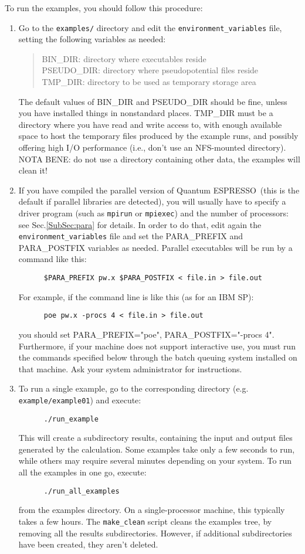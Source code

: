 \documentclass[12pt,a4paper]{article}
\def\qe{{\sc Quantum ESPRESSO}}
\begin{document}
To run the examples, you should follow this procedure:
\begin{enumerate}   
\item Go to the \texttt{examples/} directory and edit the 
  \texttt{environment\_variables} file, setting the following variables as needed: 
\begin{quote}
   BIN\_DIR: directory where executables reside\\
   PSEUDO\_DIR: directory where pseudopotential files reside\\
   TMP\_DIR: directory to be used as temporary storage area
\end{quote}
The default values of BIN\_DIR and PSEUDO\_DIR should be fine, 
unless you have installed things in nonstandard places. TMP\_DIR 
must be a directory where you have read and write access to, with 
enough available space to host the temporary files produced by the 
example runs, and possibly offering high I/O performance (i.e., don't 
use an NFS-mounted directory). NOTA BENE: do not use a
directory containing other data, the examples will clean it!
\item If you have compiled the parallel version of \qe\ (this
is the default if parallel libraries are detected), you will usually
have to specify a driver program (such as \texttt{mpirun} or \texttt{mpiexec}) 
and the number of processors: see Sec.\ref{SubSec:para} for
details. In order to do that, edit again the \texttt{environment\_variables} 
file
and set the PARA\_PREFIX and PARA\_POSTFIX variables as needed. 
Parallel executables will be run by a command like this: 
\begin{verbatim}
      $PARA_PREFIX pw.x $PARA_POSTFIX < file.in > file.out
\end{verbatim}
For example, if the command line is like this (as for an IBM SP):
\begin{verbatim}
      poe pw.x -procs 4 < file.in > file.out
\end{verbatim}
you should set PARA\_PREFIX="poe", PARA\_POSTFIX="-procs
4". Furthermore, if your machine does not support interactive use, you
must run the commands specified below through the batch queuing
system installed on that machine. Ask your system administrator for
instructions. 
\item To run a single example, go to the corresponding directory (e.g.
 \texttt{example/example01}) and execute: 
\begin{verbatim}
      ./run_example
\end{verbatim}
This will create a subdirectory results, containing the input and
output files generated by the calculation. Some examples take only a
few seconds to run, while others may require several minutes depending
on your system. To run all the examples in one go, execute:
\begin{verbatim}
      ./run_all_examples
\end{verbatim}
from the examples directory. On a single-processor machine, this
typically takes a few hours. The \texttt{make\_clean} script cleans the
examples tree, by removing all the results subdirectories. However, if
additional subdirectories have been created, they aren't deleted. 


\end{enumerate}
\end{document}
